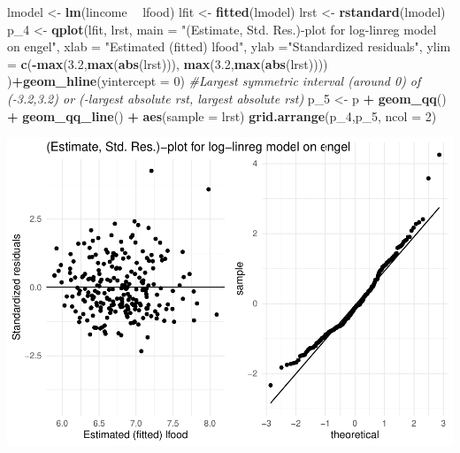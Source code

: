 \documentclass[
]{article}
\newenvironment{Shaded}{\begin{snugshade}}{\end{snugshade}}
\newcommand{\CommentTok}[1]{\textcolor[rgb]{0.56,0.35,0.01}{\textit{#1}}}
\newcommand{\DataTypeTok}[1]{\textcolor[rgb]{0.13,0.29,0.53}{#1}}
\newcommand{\DecValTok}[1]{\textcolor[rgb]{0.00,0.00,0.81}{#1}}
\newcommand{\FloatTok}[1]{\textcolor[rgb]{0.00,0.00,0.81}{#1}}
\newcommand{\KeywordTok}[1]{\textcolor[rgb]{0.13,0.29,0.53}{\textbf{#1}}}
\newcommand{\NormalTok}[1]{#1}
\newcommand{\OperatorTok}[1]{\textcolor[rgb]{0.81,0.36,0.00}{\textbf{#1}}}
\newcommand{\StringTok}[1]{\textcolor[rgb]{0.31,0.60,0.02}{#1}}
\begin{document}
\begin{Shaded}
\begin{Highlighting}[]
\NormalTok{lmodel <-}\StringTok{ }\KeywordTok{lm}\NormalTok{(lincome }\OperatorTok{~}\StringTok{ }\NormalTok{lfood)}
\NormalTok{lfit <-}\StringTok{ }\KeywordTok{fitted}\NormalTok{(lmodel)}
\NormalTok{lrst <-}\StringTok{ }\KeywordTok{rstandard}\NormalTok{(lmodel)}
\NormalTok{p_}\DecValTok{4}\NormalTok{ <-}\StringTok{ }\KeywordTok{qplot}\NormalTok{(lfit, lrst, }\DataTypeTok{main =} \StringTok{"(Estimate, Std. Res.)-plot for log-linreg model on engel"}\NormalTok{, }\DataTypeTok{xlab =} \StringTok{"Estimated (fitted) lfood"}\NormalTok{, }\DataTypeTok{ylab =}\StringTok{"Standardized residuals"}\NormalTok{, }\DataTypeTok{ylim =} \KeywordTok{c}\NormalTok{(}\OperatorTok{-}\KeywordTok{max}\NormalTok{(}\FloatTok{3.2}\NormalTok{,}\KeywordTok{max}\NormalTok{(}\KeywordTok{abs}\NormalTok{(lrst))), }\KeywordTok{max}\NormalTok{(}\FloatTok{3.2}\NormalTok{,}\KeywordTok{max}\NormalTok{(}\KeywordTok{abs}\NormalTok{(lrst)))) )}\OperatorTok{+}\KeywordTok{geom_hline}\NormalTok{(}\DataTypeTok{yintercept =} \DecValTok{0}\NormalTok{) }\CommentTok{#Largest symmetric interval (around 0) of (-3.2,3.2) or (-largest absolute rst, largest absolute rst)}
\NormalTok{p_}\DecValTok{5}\NormalTok{ <-}\StringTok{ }\NormalTok{p }\OperatorTok{+}\StringTok{ }\KeywordTok{geom_qq}\NormalTok{() }\OperatorTok{+}\StringTok{ }\KeywordTok{geom_qq_line}\NormalTok{() }\OperatorTok{+}\StringTok{ }\KeywordTok{aes}\NormalTok{(}\DataTypeTok{sample =}\NormalTok{ lrst)}
\KeywordTok{grid.arrange}\NormalTok{(p_}\DecValTok{4}\NormalTok{,p_}\DecValTok{5}\NormalTok{, }\DataTypeTok{ncol =} \DecValTok{2}\NormalTok{)}
\end{Highlighting}
\end{Shaded}

\begin{center}\includegraphics{matstatproblems20-21_files/figure-latex/unnamed-chunk-80-1} \end{center}
\end{document}
